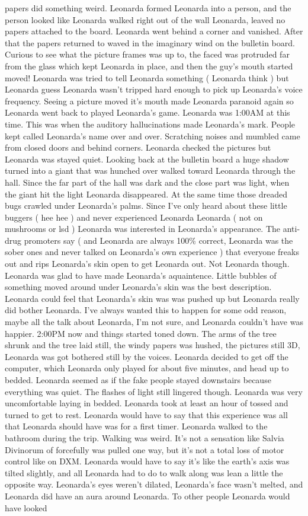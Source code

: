 \documentclass[12pt]{book}
\begin{document}
papers did something weird. Leonarda formed Leonarda into a person, and the person looked like Leonarda walked right out of the wall Leonarda, leaved no papers attached to the board. Leonarda went behind a corner and vanished. After that the papers returned to waved in the imaginary wind on the bulletin board. Curious to see what the picture frames was up to, the faced was protruded far from the glass which kept Leonarda in place, and then the guy's mouth started moved! Leonarda was tried to tell Leonarda something ( Leonarda think ) but Leonarda guess Leonarda wasn't tripped hard enough to pick up Leonarda's voice frequency. Seeing a picture moved it's mouth made Leonarda paranoid again so Leonarda went back to played Leonarda's game. Leonarda was 1:00AM at this time. This was when the auditory hallucinations made Leonarda's mark. People kept called Leonarda's name over and over. Scratching noises and mumbled came from closed doors and behind corners. Leonarda checked the pictures but Leonarda was stayed quiet. Looking back at the bulletin board a huge shadow turned into a giant that was hunched over walked toward Leonarda through the hall. Since the far part of the hall was dark and the close part was light, when the giant hit the light Leonarda disappeared. At the same time those dreaded bugs crawled under Leonarda's palms. Since I've only heard about these little buggers ( hee hee ) and never experienced Leonarda Leonarda ( not on mushrooms or lsd ) Leonarda was interested in Leonarda's appearance. The anti-drug promoters say ( and Leonarda are always 100\% correct, Leonarda was the sober ones and never talked on Leonarda's own experience ) that everyone freaks out and rips Leonarda's skin open to get Leonarda out. Not Leonarda though. Leonarda was glad to have made Leonarda's aquaintence. Little bubbles of something moved around under Leonarda's skin was the best description. Leonarda could feel that Leonarda's skin was was pushed up but Leonarda really did bother Leonarda. I've always wanted this to happen for some odd reason, maybe all the talk about Leonarda, I'm not sure, and Leonarda couldn't have was happier. 2:00PM now and things started toned down. The arms of the tree shrunk and the tree laid still, the windy papers was hushed, the pictures still 3D, Leonarda was got bothered still by the voices. Leonarda decided to get off the computer, which Leonarda only played for about five minutes, and head up to bedded. Leonarda seemed as if the fake people stayed downstairs because everything was quiet. The flashes of light still lingered though. Leonarda was very uncomfortable laying in bedded. Leonarda took at least an hour of tossed and turned to get to rest. Leonarda would have to say that this experience was all that Leonarda should have was for a first timer. Leonarda walked to the bathroom during the trip. Walking was weird. It's not a sensation like Salvia Divinorum of forcefully was pulled one way, but it's not a total loss of motor control like on DXM. Leonarda would have to say it's like the earth's axis was tilted slightly, and all Leonarda had to do to walk along was lean a little the opposite way. Leonarda's eyes weren't dilated, Leonarda's face wasn't melted, and Leonarda did have an aura around Leonarda. To other people Leonarda would have looked 
\end{document}
